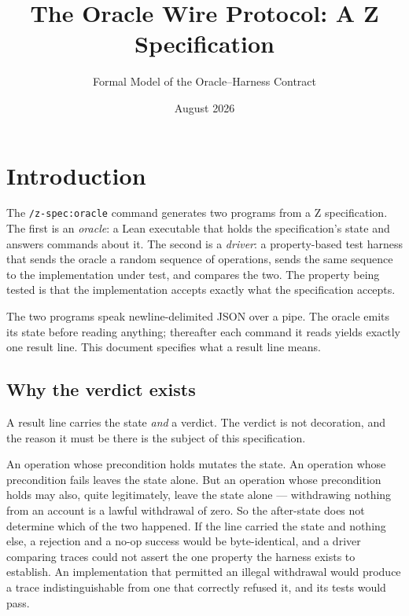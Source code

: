 \documentclass[a4paper,10pt,fleqn]{article}
\begin{document}
\title{The Oracle Wire Protocol: A Z Specification}
\author{Formal Model of the Oracle--Harness Contract}
\date{August 2026}
\maketitle

\tableofcontents
\newpage

\section{Introduction}

The \texttt{/z-spec:oracle} command generates two programs from a Z
specification. The first is an \emph{oracle}: a Lean executable that
holds the specification's state and answers commands about it. The
second is a \emph{driver}: a property-based test harness that sends the
oracle a random sequence of operations, sends the same sequence to the
implementation under test, and compares the two. The property being
tested is that the implementation accepts exactly what the specification
accepts.

The two programs speak newline-delimited JSON over a pipe. The oracle
emits its state before reading anything; thereafter each command it reads
yields exactly one result line. This document specifies what a result
line means.

\subsection{Why the verdict exists}

A result line carries the state \emph{and} a verdict. The verdict is not
decoration, and the reason it must be there is the subject of this
specification.

An operation whose precondition holds mutates the state. An operation
whose precondition fails leaves the state alone. But an operation whose
precondition holds may also, quite legitimately, leave the state alone
--- withdrawing nothing from an account is a lawful withdrawal of zero.
So the after-state does not determine which of the two happened. If the
line carried the state and nothing else, a rejection and a no-op success
would be byte-identical, and a driver comparing traces could not assert
the one property the harness exists to establish. An implementation that
permitted an illegal withdrawal would produce a trace indistinguishable
from one that correctly refused it, and its tests would pass.
\end{document}

